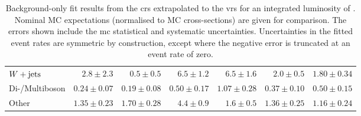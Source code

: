 \begin{table}
\begin{center}
{\begin{tabular}{lrrrrrr}
        $W+\mathrm{jets}$        & $2.8 \pm 2.3$          & $0.5 \pm 0.5$          & $6.5 \pm 1.2$    & $6.5 \pm 1.6$          & $2.0 \pm 0.5$          & $1.80 \pm 0.34$              \\
        Di-/Multiboson       & $0.24 \pm 0.07$          & $0.19 \pm 0.08$          & $0.50 \pm 0.17$     & $1.07 \pm 0.28$          & $0.37 \pm 0.10$          & $0.50 \pm 0.15$              \\
        Other       & $1.35 \pm 0.23$          & $1.70 \pm 0.28$          & $4.4 \pm 0.9$    & $1.6 \pm 0.5$          & $1.36 \pm 0.25$          & $1.16 \pm 0.24$              \\
\bottomrule
\end{tabular}
}
\end{center}
\caption{ Background-only fit results from the \glspl{cr} extrapolated to the \glspl{vr} for an integrated luminosity of \onethirtynineifb. Nominal MC expectations (normalised to MC cross-sections) are given for comparison. The errors shown include the \gls{mc} statistical and systematic uncertainties. Uncertainties in the fitted event rates are symmetric by construction, except where the negative error is truncated at an event rate of zero.
}
\label{tab:results_bkg_only_VR}
\end{table}
%